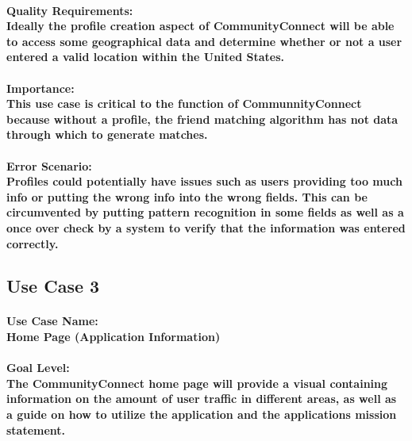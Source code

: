 \documentclass[12pt]{article}
\begin{document}
                        \paragraph{\normalfont \textbf{Quality Requirements:}\\Ideally the profile creation aspect of CommunityConnect will be able to access some geographical data and determine whether or not a user entered a valid location within the United States. 
                        }
                        \paragraph{\normalfont \textbf{Importance:}\\This use case is critical to the function of CommunnityConnect because without a profile, the friend matching algorithm has not data through which to generate matches.
                        }
                        \paragraph{\normalfont \textbf{Error Scenario:}\\Profiles could potentially have issues such as users providing too much info or putting the wrong info into the wrong fields. This can be circumvented by putting pattern recognition in some fields as well as a once over check by a system to verify that the information was entered correctly.
                        }
	
	\subsection{\bf Use Case 3}
                        \paragraph{\normalfont \textbf{Use Case Name:}\\Home Page (Application Information)
                        }
                        \paragraph{\normalfont \textbf{Goal Level:}\\ The CommunityConnect home page will provide a visual containing information on the amount of user traffic in different areas, as well as a guide on how to utilize the application and the applications mission statement.
                        }
\end{document}
